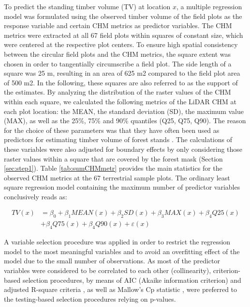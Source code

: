 To predict the standing timber volume (TV) at location $x$, a multiple regression model was formulated using the observed timber volume of the field plots as the response variable and certain CHM metrics as predictor variables. The CHM metrics were extracted at all 67 field plots within squares of constant size, which were centered at the respective plot centers. To ensure high spatial consistency between the circular field plots and the CHM metrics, the square extent was chosen in order to tangentially circumscribe a field plot. The side length of a square was 25 m, resulting in an area of 625 m2 compared to the field plot area of 500 m2. In the following, these squares are also referred to as the support of the estimates. By analyzing the distribution of the raster values of the CHM within each square, we calculated the following metrics of the LiDAR CHM at each plot location: the MEAN, the standard deviation (SD), the maximum value (MAX), as well as the 25\%, 75\% and 90\% quantiles (Q25, Q75, Q90). The reason for the choice of these parameters was that they have often been used as predictors for estimating timber volume of forest stands \citep{holmgren2004, naesset2002, lefsky1999, magnussen1999}. The calculations of these variables were also adjusted for boundary effects by only considering those raster values within a square that are covered by the forest mask (Section \ref{sec:step1}). Table \ref{tab:sumCHMmetr} provides the main statistics for the observed CHM metrics at the 67 terrestrial sample plots. The ordinary least square regression model containing the maximum number of predictor variables conclusively reads as:

\begin{equation}\label{eq:regmod}
\begin{aligned}
TV(x) & = \beta_0 + \beta_{1}MEAN(x) + \beta_{2}SD(x) + \beta_{3}MAX(x) + \beta_{4}Q25(x) \\ 
& + \beta_{4}Q75(x) + \beta_{4}Q90(x) + \varepsilon(x)
\end{aligned}
\end{equation}

A variable selection procedure was applied in order to restrict the regression model to the most meaningful variables and to avoid an overfitting effect of the model \citep{draper2014} due to the small number of observations. As most of the predictor variables were considered to be correlated to each other (collinearity), criterion-based selection procedures, by means of AIC (Akaike information criterion) \citep{akaike1992} and adjusted R-square criteria \citep{srivastava1995}, as well as Mallow's Cp statistic \citep{mallows2000}, were preferred to the testing-based selection procedures relying on p-values.

